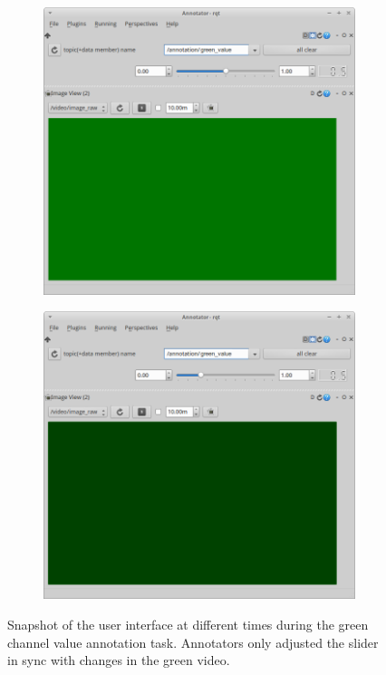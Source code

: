\documentclass[times,twocolumn,final,authoryear]{elsarticle}
\begin{document}
\begin{figure}
	\centering
	\begin{subfigure}{0.49\columnwidth}
	\includegraphics[width=\columnwidth]{images/green_ui}
	\end{subfigure}
	\begin{subfigure}{0.49\columnwidth}
	\includegraphics[width=\columnwidth]{images/green_ui2}
	\end{subfigure}
	\caption{Snapshot of the user interface at different times during the green channel value annotation task.  Annotators only adjusted the slider in sync with changes in the green video.}
	\label{fig:annotation_ui}
\end{figure}
\end{document}
